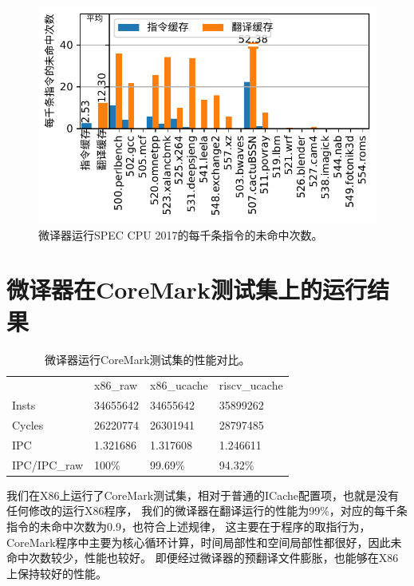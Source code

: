\begin{figure}[!htbp]
  \centering
  \includegraphics[width=1\linewidth]{./plot/new_cache_miss.pdf}
  \caption{微译器运行SPEC CPU 2017的每千条指令的未命中次数。}
  \label{img:new_cache_miss}
\end{figure}

\section{微译器在CoreMark测试集上的运行结果}

\begin{table}[]
  \centering
  \caption{
    微译器运行CoreMark测试集的性能对比。
  }
  \label{tab:coremark}
  \begin{tabular}{llll}
  \rowcolor[HTML]{FFCE93} 
               & x86\_raw & x86\_ucache & riscv\_ucache \\
  Insts        & 34655642 & 34655642    & 35899262      \\
  Cycles       & 26220774 & 26301941    & 28797485      \\
  IPC          & 1.321686 & 1.317608    & 1.246611      \\
  IPC/IPC\_raw & 100\%    & 99.69\%     & 94.32\%      
  \end{tabular}
  \end{table}

我们在X86上运行了CoreMark测试集，相对于普通的ICache配置项，也就是没有任何修改的运行X86程序，
我们的微译器在翻译运行的性能为99\%，对应的每千条指令的未命中次数为0.9，也符合上述规律，
这主要在于程序的取指行为，CoreMark程序中主要为核心循环计算，时间局部性和空间局部性都很好，因此未命中次数较少，性能也较好。
即便经过微译器的预翻译文件膨胀，也能够在X86上保持较好的性能。

